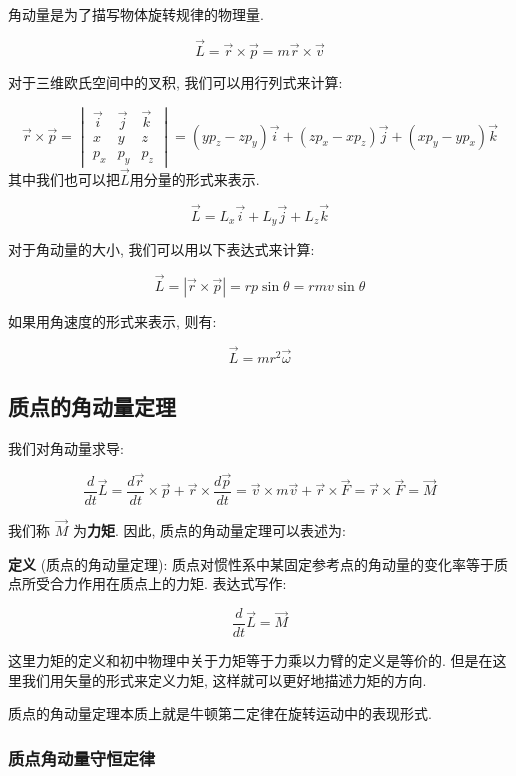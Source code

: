 \documentclass[
  a4paper,
]{ctexrep}
\begin{document}
角动量是为了描写物体旋转规律的物理量.

\[
\vec{L} = \vec{r} \times \vec{p} = m \vec{r} \times \vec{v}
\]

对于三维欧氏空间中的叉积, 我们可以用行列式来计算:

\[
\vec{r} \times \vec{p} = \begin{vmatrix}
\vec{i} & \vec{j} & \vec{k} \\
x & y & z \\
p_x & p_y & p_z
\end{vmatrix} = (y p_z - z p_y) \vec{i} + (z p_x - x p_z) \vec{j} + (x p_y - y p_x) \vec{k}
\] 其中我们也可以把\(\vec{L}\)用分量的形式来表示.

\[\vec{L} = L_x \vec{i} + L_y \vec{j} + L_z \vec{k}\]

对于角动量的大小, 我们可以用以下表达式来计算:

\[
\vec{L} = |\vec{r} \times \vec{p}| = r p \sin \theta = rmv \sin \theta
\]

如果用角速度的形式来表示, 则有:

\[
\vec{L} = m r^2 \vec{\omega}
\]

\subsection{质点的角动量定理}\label{ux8d28ux70b9ux7684ux89d2ux52a8ux91cfux5b9aux7406}

我们对角动量求导:

\[
\frac{d}{dt} \vec{L} = \frac{d\vec{r}}{dt} \times \vec{p} + \vec{r} \times \frac{d\vec{p}}{dt} = \vec{v} \times m \vec{v} + \vec{r} \times \vec{F} = \vec{r} \times \vec{F} = \vec{M}
\]

我们称 \(\vec{M}\) 为\textbf{力矩}. 因此, 质点的角动量定理可以表述为:

\textbf{定义} (质点的角动量定理):
质点对惯性系中某固定参考点的角动量的变化率等于质点所受合力作用在质点上的力矩.
表达式写作:

\[\frac{d}{dt} \vec{L} = \vec{M}\]

这里力矩的定义和初中物理中关于力矩等于力乘以力臂的定义是等价的.
但是在这里我们用矢量的形式来定义力矩, 这样就可以更好地描述力矩的方向.

质点的角动量定理本质上就是牛顿第二定律在旋转运动中的表现形式.

\subsubsection{质点角动量守恒定律}\label{ux8d28ux70b9ux89d2ux52a8ux91cfux5b88ux6052ux5b9aux5f8b}
\end{document}
